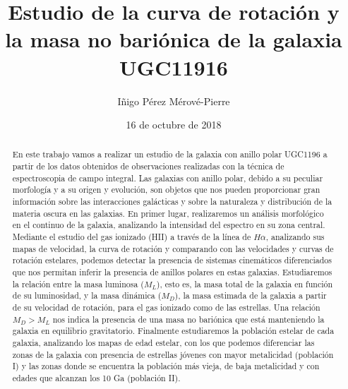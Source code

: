 \documentclass{article}
\begin{document}
\title{Estudio de la curva de rotación y la masa no bariónica de la galaxia UGC11916}

\author{Iñigo Pérez Mérové-Pierre}

\date{16 de octubre de 2018}

\maketitle

\begin{abstract}
En este trabajo vamos a realizar un estudio de la galaxia con anillo polar UGC1196 a partir de los datos obtenidos de observaciones realizadas con la técnica de espectroscopia de campo integral. Las galaxias con anillo polar, debido a su peculiar morfología y a su origen y evolución, son objetos que nos pueden proporcionar gran información sobre las interacciones galácticas y sobre la naturaleza y distribución de la materia oscura en las galaxias. En primer lugar, realizaremos un análisis morfológico en el continuo de la galaxia, analizando la intensidad del espectro en su zona central. Mediante el estudio del gas ionizado (HII) a través de la línea de $H\alpha$, analizando sus mapas de velocidad, la curva de rotación y comparando con las velocidades y curvas de rotación estelares, podemos detectar la presencia de sistemas cinemáticos diferenciados que nos permitan inferir la presencia de anillos polares en estas galaxias. Estudiaremos la relación entre la masa luminosa ($M_{L}$), esto es, la masa total de la galaxia en función de su luminosidad, y la masa dinámica ($M_{D}$), la masa estimada de la galaxia a partir de su velocidad de rotación, para el gas ionizado como de las estrellas. Una relación $M_{D} > M_{L}$ nos indica la presencia de una masa no bariónica que está manteniendo la galaxia en equilibrio gravitatorio. Finalmente estudiaremos la población estelar de cada galaxia, analizando los mapas de edad estelar, con los que podemos diferenciar las zonas de la galaxia con presencia de estrellas jóvenes con mayor metalicidad (población I) y las zonas donde se encuentra la población más vieja, de baja metalicidad y con edades que alcanzan los 10 Ga (población II). 
\end{abstract}
\end{document}
